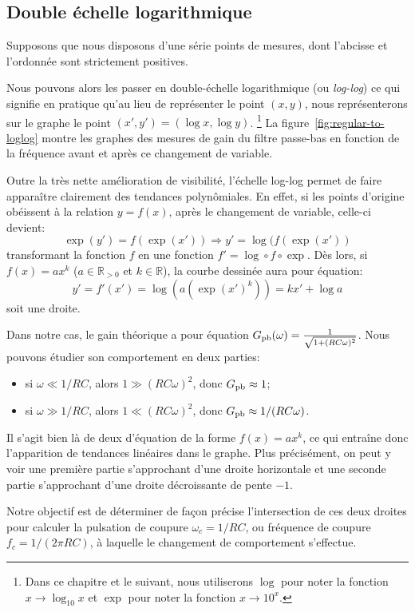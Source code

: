 \subsection{Double échelle logarithmique}
\label{subsec:approx-lin/pres/loglog}

Supposons que nous disposons d'une série points de mesures,
dont l'abcisse et l'ordonnée sont strictement positives.

Nous pouvons alors les passer
en double-échelle logarithmique (ou \emph{log-log})
ce qui signifie en pratique qu'au lieu de représenter le point $(x,y)$,
nous représenterons sur le graphe le point $(x',y') = (\log x,\log y)$.%
\footnote{
    Dans ce chapitre et le suivant, nous utiliserons
    $\log$ pour noter la fonction $x \to \log_{10} x$
    et $\exp$ pour noter la fonction $x \to 10^x$.
}
La figure~\ref{fig:regular-to-loglog} montre les graphes
des mesures de gain du filtre passe-bas en fonction de la fréquence
avant et après ce changement de variable.

Outre la très nette amélioration de visibilité,
l'échelle log-log permet de faire apparaître clairement
des tendances polynômiales.
En effet, si les points d'origine obéissent à la relation $y = f(x)$,
après le changement de variable, celle-ci devient:
\begin{equation}
    \exp(y') = f(\exp(x')) \Longrightarrow y' = \log(f(\exp(x'))
\end{equation}
transformant la fonction $f$ en une fonction $f' = \log\circ f\circ\exp$.
Dès lors, si $f(x) = ax^k$ ($a \in \mathbb{R}_{>0}$ et $k \in \mathbb{R}$),
la courbe dessinée aura pour équation:
\begin{equation}
    y' = f'(x') = \log(a(\exp(x')^k)) = kx'+\log a
\end{equation}
soit une droite.

Dans notre cas, le gain théorique a pour équation
$G_{\mathrm{pb}}(\omega) = \frac{1}{\sqrt{1+(RC\omega)^2}}$.
Nous pouvons étudier son comportement en deux parties:
\begin{itemize}
    \item si $\omega \ll 1/RC$, alors $1 \gg (RC\omega)^2$,
        donc $G_{\mathrm{pb}} \approx 1$;
    \item si $\omega \gg 1/RC$, alors $1 \ll (RC\omega)^2$,
        donc $G_{\mathrm{pb}} \approx 1/(RC\omega)$.
\end{itemize}

Il s'agit bien là de deux d'équation de la forme $f(x) = ax^k$,
ce qui entraîne donc l'apparition de tendances linéaires dans le graphe.
Plus précisément, on peut y voir
une première partie s'approchant d'une droite horizontale et
une seconde partie s'approchant d'une droite décroissante
de pente $-1$.

Notre objectif est de déterminer de façon précise
l'intersection de ces deux droites
pour calculer la pulsation de coupure $\omega_c=1/RC$,
ou fréquence de coupure $f_c=1/(2\pi RC)$,
à laquelle le changement de comportement s'effectue.
